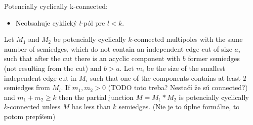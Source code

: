 \documentclass[12pt, twoside]{book}
\begin{document}
Potencially cyclically k-connected:
\begin{itemize}
	\item Neobsahuje cyklický $l$-pól pre $l<k$.
\end{itemize}

\begin{theorem}\label{th:connecting-potencially-k-connected}
	Let $M_1$ and $M_2$ be potencially cyclically $k$-connected multipoles with the same number of semiedges, which do not contain an independent edge cut of size $a$, such that after the cut there is an acyclic component with $b$ former semiedges (not resulting from the cut) and $b>a$. Let $m_i$ be the size of the smallest independent edge cut in $M_i$ such that one of the components contains at least 2 semiedges from $M_i$. If $m_1,m_2>0$ (TODO toto treba? Nestačí že sú connected?) and $m_1+m_2\geq k$ then the partial junction $M=M_1*M_2$ is potencially cyclically $k$-connected unless $M$ has less than $k$ semiedges. (Nie je to úplne formálne, to potom prepíšem)
\end{theorem}
\end{document}
